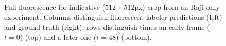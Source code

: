 \begin{figure}%
    \centering
    \qquad
    \qquad
    \qquad
\caption{Full fluorescence for indicative ($512 \times 512$px) crop from an Raji-only experiment. Columns distinguish fluorescent labeler predictions (left) and ground truth (right); rows distinguish times an early frame ($t=0$) (top) and a later one ($t=48$) (bottom).}
\label{fig:full_colour_raji}
\end{figure}

